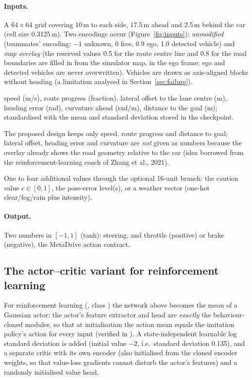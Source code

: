 \paragraph{Inputs.}
\begin{description}[leftmargin=3.4cm,style=nextline]
\item[Bird's-eye view] A $64\times64$ grid covering 10\,m to each side, 17.5\,m ahead and 2.5\,m behind the car (cell size 0.3125\,m). Two encodings occur (Figure~\ref{fig:inputs}):
 \emph{unmodified} (teammates' encoding: $-1$ unknown, 0 free, 0.9 ego, 1.0 detected vehicle) and \emph{map overlay} (the reserved values 0.5 for the route centre line and 0.8 for the road boundaries are filled in from the simulator map, in the ego frame; ego and detected vehicles are never overwritten).
 Vehicles are drawn as axis-aligned blocks without heading (a limitation analysed in Section~\ref{sec:failure}).
\item[Six vehicle-state inputs] speed (m/s), route progress (fraction), lateral offset to the lane centre (m), heading error (rad), curvature ahead (rad/m), distance to the goal (m); standardised with the mean and standard deviation stored in the checkpoint.
\item[Three vehicle-state inputs] The proposed design keeps only speed, route progress and distance to goal; lateral offset, heading error and curvature are \emph{not} given as numbers because the overlay already shows the road geometry relative to the car (idea borrowed from the reinforcement-learning coach of Zhang et al., 2021).
\item[Extra input] One to four additional values through the optional 16-unit branch: the caution value $c\in[0,1]$, the pose-error level(s), or a weather vector (one-hot clear/fog/rain plus intensity).
\end{description}



\paragraph{Output.} Two numbers in $[-1,1]$ (tanh): steering, and throttle (positive) or brake (negative), the MetaDrive action contract.

\subsection{The actor--critic variant for reinforcement learning}
For reinforcement learning (, class ) the network above becomes the mean of a Gaussian actor: the actor's feature extractor and head are \emph{exactly} the behaviour-cloned modules, so that at initialisation the action mean equals the imitation policy's action for every input (verified in ).
A state-independent learnable log standard deviation is added (initial value $-2$, i.e.\ standard deviation 0.135), and a separate critic with its own encoder (also initialised from the cloned encoder weights, so that value-loss gradients cannot disturb the actor's features) and a randomly initialised value head.

